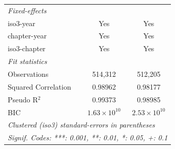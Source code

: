 \begin{tabular}{lcc}
   \midrule
   \emph{Fixed-effects}\\
   iso3-year                                                         & Yes                   & Yes\\  
   chapter-year                                                      & Yes                   & Yes\\  
   iso3-chapter                                                      & Yes                   & Yes\\  
   \midrule
   \emph{Fit statistics}\\
   Observations                                                      & 514,312               & 512,205\\  
   Squared Correlation                                               & 0.98962               & 0.98177\\  
   Pseudo R$^2$                                                      & 0.99373               & 0.98985\\  
   BIC                                                               & $1.63\times 10^{10}$  & $2.53\times 10^{10}$\\   
   \midrule \midrule
   \multicolumn{3}{l}{\emph{Clustered (iso3) standard-errors in parentheses}}\\
   \multicolumn{3}{l}{\emph{Signif. Codes: ***: 0.001, **: 0.01, *: 0.05, +: 0.1}}\\
\end{tabular}
\par\endgroup


